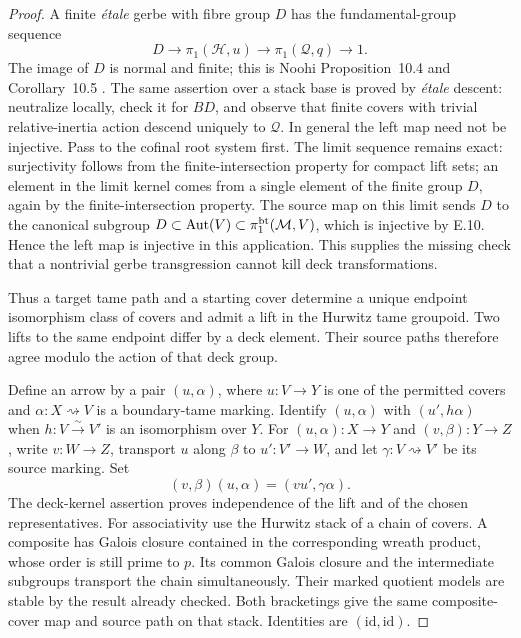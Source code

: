 \begin{proof}
A finite \emph{\'etale} gerbe with fibre group $D$ has the
fundamental-group sequence
\[
       D\longrightarrow\pi_1(\mathcal H,u)
         \longrightarrow\pi_1(\mathcal Q,q)\longrightarrow1.
\]
The image of $D$ is normal and finite; this is Noohi
Proposition~10.4 and Corollary~10.5
\citep{F_Noohi2004}. The same assertion over a stack base is
proved by \emph{\'etale} descent: neutralize locally, check
it for $BD$, and observe that finite covers with trivial
relative-inertia action descend uniquely to $\mathcal Q$.
In general the left map need not be injective. Pass to the
cofinal root system first. The limit sequence remains exact:
surjectivity follows from the finite-intersection property
for compact lift sets; an element in the limit kernel comes
from a single element of the finite group $D$, again by the
finite-intersection property. The source map on this limit
sends $D$ to the canonical subgroup
$D\subset\operatorname{Aut}(V)\subset\pi_1^{\mathrm{bt}}(\mathcal M,V)$,
which is injective by E.10. Hence the left map is injective in
this application. This supplies the missing check that a
nontrivial gerbe transgression cannot kill deck transformations.

Thus a target tame path and a starting cover determine a unique
endpoint isomorphism class of covers and admit a lift in the
Hurwitz tame groupoid. Two lifts to the same endpoint differ by
a deck element. Their source paths therefore agree modulo the
action of that deck group.

Define an arrow by a pair $(u,\alpha)$, where $u:V\to Y$ is
one of the permitted covers and
$\alpha:X\rightsquigarrow V$ is a boundary-tame marking.
Identify $(u,\alpha)$ with $(u',h\alpha)$ when
$h:V\xrightarrow{\sim}V'$ is an isomorphism over $Y$.
For $(u,\alpha):X\to Y$ and $(v,\beta):Y\to Z$, write
$v:W\to Z$, transport $u$ along $\beta$ to
$u':V'\to W$, and let $\gamma:V\rightsquigarrow V'$ be its
source marking. Set
\[
                  (v,\beta)(u,\alpha)
                     =(vu',\gamma\alpha).
\]
The deck-kernel assertion proves independence of the lift and
of the chosen representatives. For associativity use the
Hurwitz stack of a chain of covers. A composite has Galois
closure contained in the corresponding wreath product, whose
order is still prime to $p$. Its common Galois closure and
the intermediate subgroups transport the chain simultaneously.
Their marked quotient models are stable by the result already
checked. Both bracketings give the same composite-cover map
and source path on that stack. Identities are $(\mathrm{id},
\mathrm{id})$.


\end{proof}
